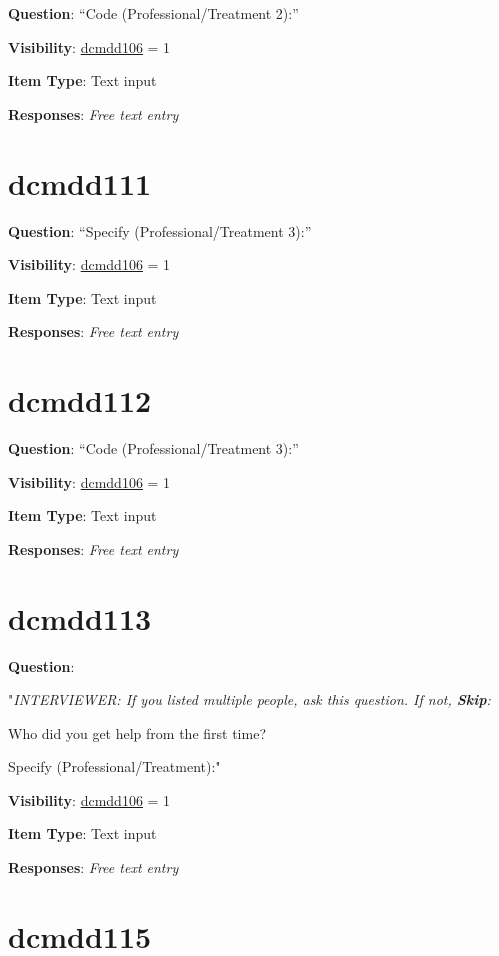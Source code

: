 \documentclass[
]{book}
\begin{document}
\textbf{Question}: ``Code (Professional/Treatment 2):''

\textbf{Visibility}: \protect\hyperlink{dcmdd106}{dcmdd106} = 1

\textbf{Item Type}: Text input

\textbf{Responses}: \emph{Free text entry}

\hypertarget{dcmdd111}{%
\section{dcmdd111}\label{dcmdd111}}

\textbf{Question}: ``Specify (Professional/Treatment 3):''

\textbf{Visibility}: \protect\hyperlink{dcmdd106}{dcmdd106} = 1

\textbf{Item Type}: Text input

\textbf{Responses}: \emph{Free text entry}

\hypertarget{dcmdd112}{%
\section{dcmdd112}\label{dcmdd112}}

\textbf{Question}: ``Code (Professional/Treatment 3):''

\textbf{Visibility}: \protect\hyperlink{dcmdd106}{dcmdd106} = 1

\textbf{Item Type}: Text input

\textbf{Responses}: \emph{Free text entry}

\hypertarget{dcmdd113}{%
\section{dcmdd113}\label{dcmdd113}}

\textbf{Question}:

"\emph{INTERVIEWER: If you listed multiple people, ask this question. If not, \textbf{Skip}:}

Who did you get help from the first time?

Specify (Professional/Treatment):"

\textbf{Visibility}: \protect\hyperlink{dcmdd106}{dcmdd106} = 1

\textbf{Item Type}: Text input

\textbf{Responses}: \emph{Free text entry}

\hypertarget{dcmdd115}{%
\section{dcmdd115}\label{dcmdd115}}
\end{document}

